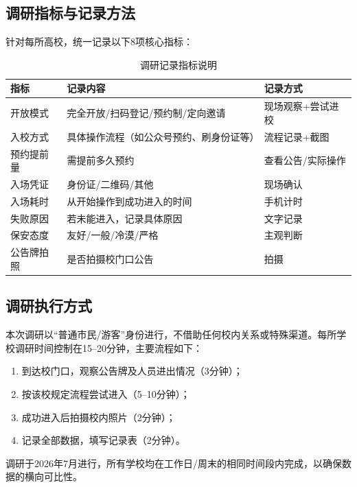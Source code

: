 \documentclass[12pt]{article}
\begin{document}
\vspace{0.5cm}

\subsection{调研指标与记录方法}

针对每所高校，统一记录以下8项核心指标：

\begin{table}[H]
\centering
\caption{调研记录指标说明}
\label{tab:indicators}
\begin{tabular}{p{3cm}p{4.5cm}p{4cm}}
\toprule
\textbf{指标} & \textbf{记录内容} & \textbf{记录方式} \\
\midrule
开放模式 & 完全开放/扫码登记/预约制/定向邀请 & 现场观察+尝试进校 \\
入校方式 & 具体操作流程（如公众号预约、刷身份证等） & 流程记录+截图 \\
预约提前量 & 需提前多久预约 & 查看公告/实际操作 \\
入场凭证 & 身份证/二维码/其他 & 现场确认 \\
入场耗时 & 从开始操作到成功进入的时间 & 手机计时 \\
失败原因 & 若未能进入，记录具体原因 & 文字记录 \\
保安态度 & 友好/一般/冷漠/严格 & 主观判断 \\
公告牌拍照 & 是否拍摄校门口公告 & 拍摄 \\
\bottomrule
\end{tabular}
\end{table}

\subsection{调研执行方式}

本次调研以“普通市民/游客”身份进行，不借助任何校内关系或特殊渠道。每所学校调研时间控制在15–20分钟，主要流程如下：

\begin{enumerate}[leftmargin=2em]
    \item 到达校门口，观察公告牌及人员进出情况（3分钟）；
    \item 按该校规定流程尝试进入（5–10分钟）；
    \item 成功进入后拍摄校内照片（2分钟）；
    \item 记录全部数据，填写记录表（2分钟）。
\end{enumerate}

调研于2026年7月进行，所有学校均在工作日/周末的相同时间段内完成，以确保数据的横向可比性。
\end{document}
